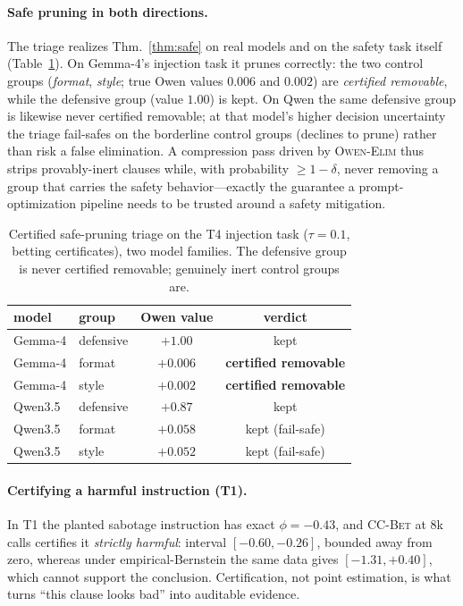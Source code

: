 \documentclass[10pt,twocolumn,letterpaper]{article}
\theoremstyle{plain}
\theoremstyle{definition}
\newcommand{\shap}{\phi}
\begin{document}
\paragraph{Safe pruning in both directions.} The triage realizes
Thm.~\ref{thm:safe} on real models and on the safety task itself
(Table~\ref{tab:triage}). On Gemma-4's injection task it prunes correctly:
the two control groups (\emph{format}, \emph{style}; true Owen values
$0.006$ and $0.002$) are \emph{certified removable}, while the defensive group
(value $1.00$) is kept. On Qwen the same defensive group is likewise never
certified removable; at that model's higher decision uncertainty the triage
fail-safes on the borderline control groups (declines to prune) rather than
risk a false elimination. A compression pass driven by \textsc{Owen-Elim} thus
strips provably-inert clauses while, with probability $\ge1-\delta$, never
removing a group that carries the safety behavior---exactly the guarantee a
prompt-optimization pipeline needs to be trusted around a safety mitigation.

\begin{table}[t]
\centering\small
\caption{Certified safe-pruning triage on the T4 injection task
($\tau{=}0.1$, betting certificates), two model families. The defensive group
is never certified removable; genuinely inert control groups are.}
\label{tab:triage}
\begin{tabular}{llcc}
\toprule
model & group & Owen value & verdict \\
\midrule
Gemma-4 & defensive & $+1.00$ & kept \\
Gemma-4 & format    & $+0.006$ & \textbf{certified removable} \\
Gemma-4 & style     & $+0.002$ & \textbf{certified removable} \\
\midrule
Qwen3.5 & defensive & $+0.87$ & kept \\
Qwen3.5 & format    & $+0.058$ & kept (fail-safe) \\
Qwen3.5 & style     & $+0.052$ & kept (fail-safe) \\
\bottomrule
\end{tabular}
\end{table}

\paragraph{Certifying a harmful instruction (T1).} In T1 the planted sabotage
instruction has exact $\shap=-0.43$, and \textsc{CC-Bet} at $8$k calls certifies
it \emph{strictly harmful}: interval $[-0.60,-0.26]$, bounded away from zero,
whereas under empirical-Bernstein the same data gives $[-1.31,+0.40]$, which
cannot support the conclusion. Certification, not point estimation, is what turns
``this clause looks bad'' into auditable evidence.
\end{document}
